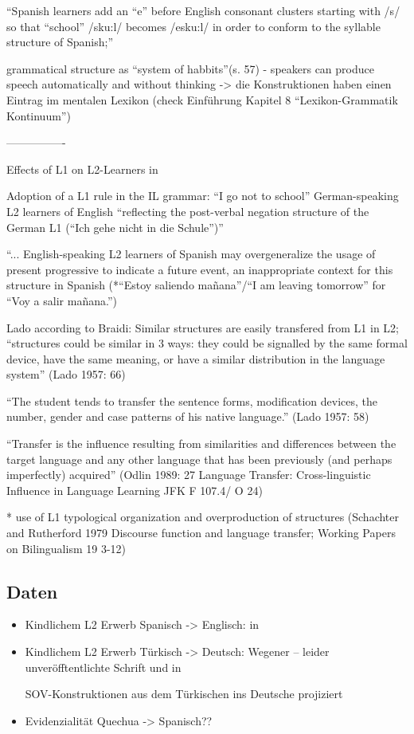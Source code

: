 ``Spanish learners add an ``e'' before English consonant clusters starting with /s/ so that ``school'' /sku:l/ becomes /esku:l/ in order to conform to the syllable structure of Spanish;''

grammatical structure as ``system of habbits''(s. 57) - speakers can produce speech automatically and without thinking -> die Konstruktionen haben einen Eintrag im mentalen Lexikon (check Einführung \cite{Ziem13} Kapitel 8 ``Lexikon-Grammatik Kontinuum'')

----------------

Effects of L1 on L2-Learners in \cite{Braidi99}


Adoption of a L1 rule in the IL grammar:
``I go not to school'' German-speaking L2 learners of English ``reflecting the post-verbal negation structure
of the German L1 (``Ich gehe nicht in die Schule'')''

``... English-speaking L2 learners of Spanish may overgeneralize the usage of present progressive to indicate a
future event, an inappropriate context for this structure in Spanish (*``Estoy saliendo mañana''/``I am leaving tomorrow''
for ``Voy a salir mañana.'')


Lado according to Braidi:
Similar structures are easily transfered from L1 in L2;
``structures could be similar in 3 ways: they could be signalled by the same formal device, have the same meaning,
or have a similar distribution in the language system'' (Lado 1957: 66)

``The student tends to transfer the sentence forms, modification devices, the number, gender and case patterns of
his native language.'' (Lado 1957: 58)

``Transfer is the influence resulting from similarities and differences between the target language and any other
language that has been previously (and perhaps imperfectly) acquired'' (Odlin 1989: 27 Language Transfer: Cross-linguistic Influence in Language Learning
JFK F 107.4/ O 24)

* use of L1 typological organization and overproduction of structures (Schachter and Rutherford 1979 Discourse function and language transfer; Working Papers on Bilingualism 19 3-12)


\subsection{Daten}
\begin{itemize}
    \item Kindlichem L2 Erwerb Spanisch -> Englisch: \cite{Wong-Fillmore76} in \cite{Haberzettl06}
    \item Kindlichem L2 Erwerb Türkisch -> Deutsch: Wegener\cite{} -- leider unveröfftentlichte Schrift
und \cite{Haberzettl05} in \cite{Haberzettl06}

SOV-Konstruktionen aus dem Türkischen ins Deutsche projiziert

    \item Evidenzialität Quechua -> Spanisch??
\end{itemize}
